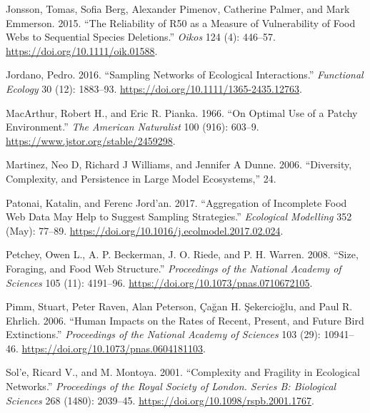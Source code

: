 \documentclass{article}
\newlength{\cslhangindent}
\newlength{\cslentryspacingunit} %
\newenvironment{CSLReferences}[2] %
 {%
  \setlength{\parindent}{0pt}
  \ifodd #1
  \let\oldpar\par
  \def\par{\hangindent=\cslhangindent\oldpar}
  \fi
  \setlength{\parskip}{#2\cslentryspacingunit}
 }%
 {}
\begin{document}
\begin{CSLReferences}{1}{0}
\leavevmode{}%
Jonsson, Tomas, Sofia Berg, Alexander Pimenov, Catherine Palmer, and
Mark Emmerson. 2015. {``The Reliability of {R50} as a Measure of
Vulnerability of Food Webs to Sequential Species Deletions.''}
\emph{Oikos} 124 (4): 446--57. \url{https://doi.org/10.1111/oik.01588}.

\leavevmode{}%
Jordano, Pedro. 2016. {``Sampling Networks of Ecological
Interactions.''} \emph{Functional Ecology} 30 (12): 1883--93.
\url{https://doi.org/10.1111/1365-2435.12763}.

\leavevmode{}%
MacArthur, Robert H., and Eric R. Pianka. 1966. {``On Optimal Use of a
Patchy Environment.''} \emph{The American Naturalist} 100 (916): 603--9.
\url{https://www.jstor.org/stable/2459298}.

\leavevmode{}%
Martinez, Neo D, Richard J Williams, and Jennifer A Dunne. 2006.
{``Diversity, {Complexity}, and {Persistence} in {Large Model
Ecosystems},''} 24.

\leavevmode{}%
Patonai, Katalin, and Ferenc Jord'an. 2017. {``Aggregation of Incomplete
Food Web Data May Help to Suggest Sampling Strategies.''}
\emph{Ecological Modelling} 352 (May): 77--89.
\url{https://doi.org/10.1016/j.ecolmodel.2017.02.024}.

\leavevmode{}%
Petchey, Owen L., A. P. Beckerman, J. O. Riede, and P. H. Warren. 2008.
{``Size, Foraging, and Food Web Structure.''} \emph{Proceedings of the
National Academy of Sciences} 105 (11): 4191--96.
\url{https://doi.org/10.1073/pnas.0710672105}.

\leavevmode{}%
Pimm, Stuart, Peter Raven, Alan Peterson, Çağan H. Şekercioğlu, and Paul
R. Ehrlich. 2006. {``Human Impacts on the Rates of Recent, Present, and
Future Bird Extinctions.''} \emph{Proceedings of the National Academy of
Sciences} 103 (29): 10941--46.
\url{https://doi.org/10.1073/pnas.0604181103}.

\leavevmode{}%
Sol'e, Ricard V., and M. Montoya. 2001. {``Complexity and Fragility in
Ecological Networks.''} \emph{Proceedings of the Royal Society of
London. Series B: Biological Sciences} 268 (1480): 2039--45.
\url{https://doi.org/10.1098/rspb.2001.1767}.


\end{CSLReferences}
\end{document}
